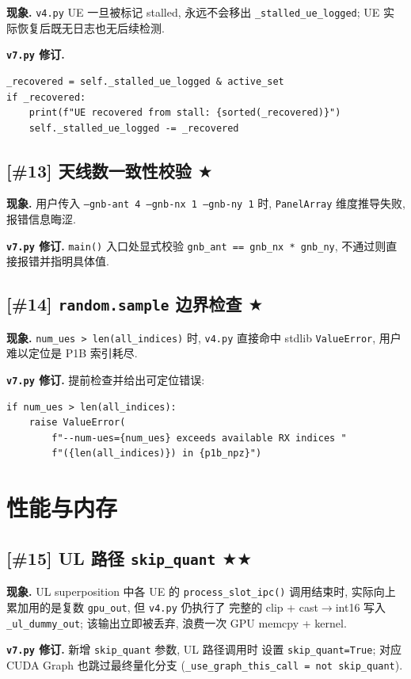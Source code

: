 \documentclass[11pt,a4paper,UTF8,fontset=fandol]{ctexart}
\newcommand{\sone}{\textcolor{starcolor}{$\bigstar$}}
\newcommand{\stwo}{\textcolor{starcolor}{$\bigstar\bigstar$}}
\newcommand{\vfour}{\texttt{v4.py}}
\newcommand{\vseven}{\texttt{v7.py}}
\newcommand{\bugitem}[3]{%
  \subsection{[\##1] #2 \hfill #3}%
  \vspace{-0.5em}%
}
\begin{document}
\textbf{现象.} \vfour{} UE 一旦被标记 stalled, 永远不会移出
\texttt{\_stalled\_ue\_logged}; UE 实际恢复后既无日志也无后续检测.

\textbf{\vseven{} 修订.}
\begin{verbatim}
_recovered = self._stalled_ue_logged & active_set
if _recovered:
    print(f"UE recovered from stall: {sorted(_recovered)}")
    self._stalled_ue_logged -= _recovered
\end{verbatim}

\bugitem{13}{天线数一致性校验}{\sone}

\textbf{现象.} 用户传入 \texttt{--gnb-ant 4 --gnb-nx 1 --gnb-ny 1} 时,
\texttt{PanelArray} 维度推导失败, 报错信息晦涩.

\textbf{\vseven{} 修订.} \texttt{main()} 入口处显式校验
\texttt{gnb\_ant == gnb\_nx * gnb\_ny}, 不通过则直接报错并指明具体值.

\bugitem{14}{\texttt{random.sample} 边界检查}{\sone}

\textbf{现象.} \texttt{num\_ues > len(all\_indices)} 时,
\vfour{} 直接命中 stdlib \texttt{ValueError}, 用户难以定位是 P1B 索引耗尽.

\textbf{\vseven{} 修订.} 提前检查并给出可定位错误:
\begin{verbatim}
if num_ues > len(all_indices):
    raise ValueError(
        f"--num-ues={num_ues} exceeds available RX indices "
        f"({len(all_indices)}) in {p1b_npz}")
\end{verbatim}

\section{性能与内存}
\label{sec:performance}

\bugitem{15}{UL 路径 \texttt{skip\_quant}}{\stwo}

\textbf{现象.} UL superposition 中各 UE 的 \texttt{process\_slot\_ipc()}
调用结束时, 实际向上累加用的是复数 \texttt{gpu\_out}, 但 \vfour{} 仍执行了
完整的 clip + cast$\to$int16 写入 \texttt{\_ul\_dummy\_out};
该输出立即被丢弃, 浪费一次 GPU memcpy + kernel.

\textbf{\vseven{} 修订.} 新增 \texttt{skip\_quant} 参数, UL 路径调用时
设置 \texttt{skip\_quant=True}; 对应 CUDA Graph 也跳过最终量化分支
(\texttt{\_use\_graph\_this\_call = not skip\_quant}).
\end{document}
